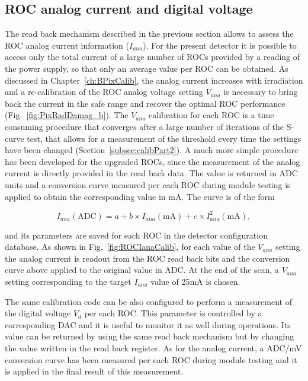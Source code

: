 \subsection{ROC analog current and digital voltage}

The read back mechanism described in the previous section allows to assess the ROC analog current information ($I_{ana}$).
For the present detector it is possible to access only the total current of a large number of ROCs provided by a reading of the power supply, so that only an average value per ROC can be obtained.
As discussed in Chapter~\ref{ch:BPixCalib}, the analog current increases with irradiation and a re-calibration of the ROC analog voltage setting $V_{ana}$
is necessary to bring back the current in the safe range and recover the optimal ROC performance (Fig.~\ref{fig:PixRadDamag_b}).
The $V_{ana}$ calibration for each ROC is a time consuming procedure that converges after a large number of iterations of the S-curve test,
that allows for a measurement of the threshold every time the settings have been changed (Section~\ref{subsec:calibPart2}).
A much more simple procedure has been developed for the upgraded ROCs, since the measurement of the analog current is directly provided in the read back data.
The value is returned in ADC units and a conversion curve measured per each ROC during module testing is applied to obtain the corresponding value in mA.
The curve is of the form

\begin{equation}
I_{ana} (\mathrm{ADC}) = a + b \times I_{ana} (\mathrm{mA}) + c \times I_{ana}^2 (\mathrm{mA}),
\end{equation}

and its parameters are saved for each ROC in the detector configuration database.
As shown in Fig.~\ref{fig:ROCIanaCalib}, for each value of the $V_{ana}$ setting the analog current is readout from the ROC read back bits
and the conversion curve above applied to the original value in ADC.
At the end of the scan, a $V_{ana}$ setting corresponding to the target $I_{ana}$ value of 25\unit{mA} is chosen.

The same calibration code can be also configured to perform a measurement of the digital voltage $V_d$ per each ROC.
This parameter is controlled by a corresponding DAC and it is useful to monitor it as well during operations.
Its value can be returned by using the same read back mechanism but by changing the value written in the read back register.
As for the analog current, a ADC/mV conversion curve has been measured per each ROC during module testing
and it is applied in the final result of this measurement.

